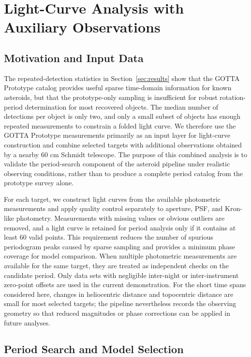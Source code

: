 \documentclass[referee]{raa}
\begin{document}
\FloatBarrier

\section{Light-Curve Analysis with Auxiliary Observations}
\label{sec:lightcurve}

\subsection{Motivation and Input Data}

The repeated-detection statistics in Section~\ref{sec:results} show that the GOTTA Prototype catalog provides useful sparse time-domain information for known asteroids, but that the prototype-only sampling is insufficient for robust rotation-period determination for most recovered objects. The median number of detections per object is only two, and only a small subset of objects has enough repeated measurements to constrain a folded light curve. We therefore use the GOTTA Prototype measurements primarily as an input layer for light-curve construction and combine selected targets with additional observations obtained by a nearby 60 cm Schmidt telescope. The purpose of this combined analysis is to validate the period-search component of the asteroid pipeline under realistic observing conditions, rather than to produce a complete period catalog from the prototype survey alone.

For each target, we construct light curves from the available photometric measurements and apply quality control separately to aperture, PSF, and Kron-like photometry. Measurements with missing values or obvious outliers are removed, and a light curve is retained for period analysis only if it contains at least 60 valid points. This requirement reduces the number of spurious periodogram peaks caused by sparse sampling and provides a minimum phase coverage for model comparison. When multiple photometric measurements are available for the same target, they are treated as independent checks on the candidate period. Only data sets with negligible inter-night or inter-instrument zero-point offsets are used in the current demonstration. For the short time spans considered here, changes in heliocentric distance and topocentric distance are small for most selected targets; the pipeline nevertheless records the observing geometry so that reduced magnitudes or phase corrections can be applied in future analyses.

\subsection{Period Search and Model Selection}
\end{document}
